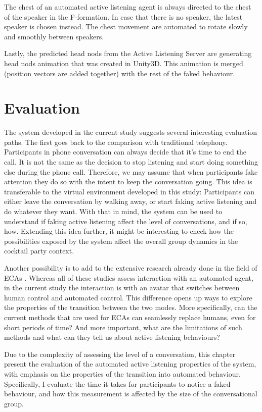 \documentclass[]{simple-thesis}
\begin{document}
The chest of an automated active listening agent is always directed to the chest of the speaker in the F-formation.
In case that there is no speaker, the latest speaker is chosen instead.
The chest movement are automated to rotate slowly and smoothly between speakers.

Lastly, the predicted head nods from the Active Listening Server are generating head nods animation that was created in Unity3D.
This animation is merged (position vectors are added together) with the rest of the faked behaviour.


\chapter{Evaluation}\label{evaluation}

The system developed in the current study suggests several interesting evaluation paths.
The first goes back to the comparison with traditional telephony.
Participants in phone conversation can always decide that it's time to end the call.
It is not the same as the decision to stop listening and start doing something else during the phone call.
Therefore, we may assume that when participants fake attention they do so with the intent to keep the conversation going.
This idea is transferable to the virtual environment developed in this study:
Participants can either leave the conversation by walking away, or start faking active listening and do whatever they want.
With that in mind, the system can be used to understand if faking active listening affect the level of conversations, and if so, how.
Extending this idea further, it might be interesting to check how the possibilities exposed by the system affect the overall group dynamics in the cocktail party context.

Another possibility is to add to the extensive research already done in the field of ECAs \citep{Nishimura2007, Bevacqua2008, Gratch2007, Huang2011, Lee2006, Poppe2013}.
Whereas all of these studies assess interaction with an automated agent, in the current study the interaction is with an avatar that switches between human control and automated control.
This difference opens up ways to explore the properties of the transition between the two modes.
More specifically, can the current methods that are used for ECAs can seamlessly replace humans, even for short periods of time?
And more important, what are the limitations of such methods and what can they tell us about active listening behaviours?

Due to the complexity of assessing the level of a conversation, this chapter present the evaluation of the automated active listening properties of the system, with emphasis on the properties of the transition into automated behaviour.
Specifically, I evaluate the time it takes for participants to notice a faked behaviour, and how this measurement is affected by the size of the conversational group.
\end{document}
